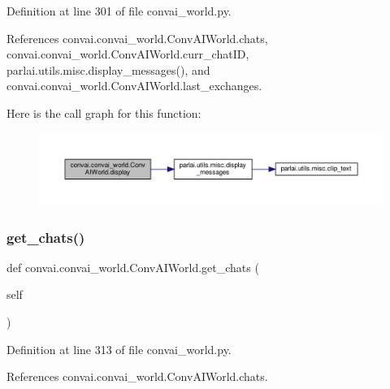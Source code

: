 Definition at line 301 of file convai\+\_\+world.\+py.



References convai.\+convai\+\_\+world.\+Conv\+A\+I\+World.\+chats, convai.\+convai\+\_\+world.\+Conv\+A\+I\+World.\+curr\+\_\+chat\+ID, parlai.\+utils.\+misc.\+display\+\_\+messages(), and convai.\+convai\+\_\+world.\+Conv\+A\+I\+World.\+last\+\_\+exchanges.

Here is the call graph for this function\+:
\nopagebreak
\begin{figure}[H]
\begin{center}
\leavevmode
\includegraphics[width=350pt]{classconvai_1_1convai__world_1_1ConvAIWorld_aba441045b286ea6345701ca6295a4ba5_cgraph}
\end{center}
\end{figure}
\mbox{\label{classconvai_1_1convai__world_1_1ConvAIWorld_a231eeb8ff53b0b334d4ccdd6e44145b8}} 
\subsubsection{\texorpdfstring{get\+\_\+chats()}{get\_chats()}}
{\footnotesize\ttfamily def convai.\+convai\+\_\+world.\+Conv\+A\+I\+World.\+get\+\_\+chats (\begin{DoxyParamCaption}\item[{}]{self }\end{DoxyParamCaption})}



Definition at line 313 of file convai\+\_\+world.\+py.



References convai.\+convai\+\_\+world.\+Conv\+A\+I\+World.\+chats.

\mbox{\label{classconvai_1_1convai__world_1_1ConvAIWorld_a86b9befc00ec10bc59bf1051bc4ff7e7}} 
